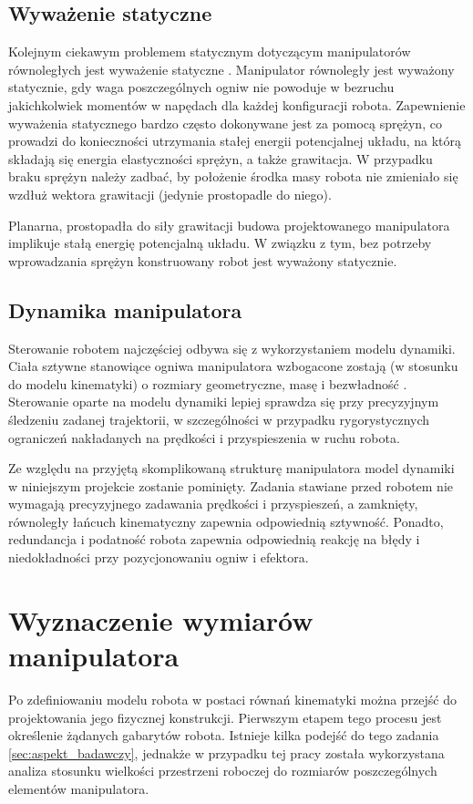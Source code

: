 \documentclass[printmode]{mgr}
\begin{document}
\section{Wyważenie statyczne}
Kolejnym ciekawym problemem statycznym dotyczącym manipulatorów równoległych jest wyważenie statyczne \cite{handbook}.
Manipulator równoległy jest wyważony statycznie, gdy waga poszczególnych ogniw nie powoduje w bezruchu jakichkolwiek 
momentów w napędach dla każdej konfiguracji robota. Zapewnienie wyważenia statycznego bardzo często dokonywane jest za pomocą
sprężyn, co prowadzi do konieczności utrzymania stałej energii potencjalnej układu, na którą składają się energia elastyczności sprężyn, 
a także grawitacja. W przypadku braku sprężyn należy zadbać, by położenie środka masy robota nie zmieniało się wzdłuż wektora
grawitacji (jedynie prostopadle do niego).

Planarna, prostopadła do siły grawitacji budowa projektowanego manipulatora implikuje stałą energię potencjalną układu. W związku z tym,
bez potrzeby wprowadzania sprężyn konstruowany robot jest wyważony statycznie.

\section{Dynamika manipulatora}
Sterowanie robotem najczęściej odbywa się z wykorzystaniem modelu dynamiki. Ciała sztywne stanowiące ogniwa
manipulatora wzbogacone zostają (w stosunku do modelu kinematyki) o rozmiary geometryczne, masę i bezwładność \cite{podstawy_robotyki}.
Sterowanie oparte na modelu dynamiki lepiej sprawdza się przy precyzyjnym śledzeniu zadanej trajektorii, w szczególności
w przypadku rygorystycznych ograniczeń nakładanych na prędkości i przyspieszenia w ruchu robota. 

Ze względu na przyjętą skomplikowaną strukturę manipulatora model dynamiki w niniejszym projekcie zostanie pominięty. Zadania stawiane
przed robotem nie wymagają precyzyjnego zadawania prędkości i przyspieszeń, a zamknięty, równoległy łańcuch kinematyczny
zapewnia odpowiednią sztywność. Ponadto, redundancja i podatność robota zapewnia odpowiednią reakcję na błędy i niedokładności
przy pozycjonowaniu ogniw i efektora.


\chapter{Wyznaczenie wymiarów manipulatora}\label{sec:wyznaczenie_wymiarow_manipulatora}
Po zdefiniowaniu modelu robota w postaci równań kinematyki można przejść do projektowania
jego fizycznej konstrukcji. Pierwszym etapem tego procesu jest określenie żądanych gabarytów
robota. Istnieje kilka podejść do tego zadania \ref{sec:aspekt_badawczy}, jednakże w przypadku tej pracy została
wykorzystana analiza stosunku wielkości przestrzeni roboczej do rozmiarów poszczególnych
elementów manipulatora.
\end{document}
